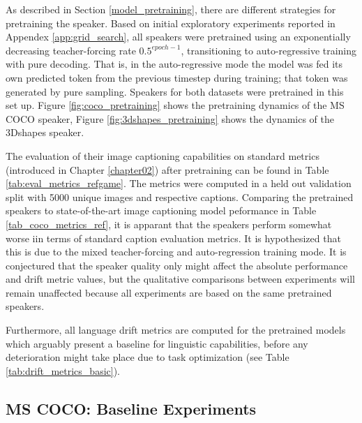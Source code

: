 As described in Section \ref{model_pretraining}, there are different strategies for pretraining the speaker. Based on initial exploratory experiments reported in Appendex \ref{app:grid_search}, all speakers were pretrained using an exponentially decreasing teacher-forcing rate $0.5^{epoch-1}$, transitioning to auto-regressive training with pure decoding. That is, in the auto-regressive mode the model was fed its own predicted token from the previous timestep during training; that token was generated by pure sampling. Speakers for both datasets were pretrained in this set up. Figure \ref{fig:coco_pretraining} shows the pretraining dynamics of the MS COCO speaker, Figure \ref{fig:3dshapes_pretraining} shows the dynamics of the 3Dshapes speaker.

The evaluation of their image captioning capabilities on standard metrics (introduced in Chapter \ref{chapter02}) after pretraining can be found in Table \ref{tab:eval_metrics_refgame}. The metrics were computed in a held out validation split with 5000 unique images and respective captions. Comparing the pretrained speakers to state-of-the-art image captioning model peformance in Table \ref{tab_coco_metrics_ref}, it is apparant that the speakers perform somewhat worse iin terms of standard caption evaluation metrics. It is hypothesized that this is due to the mixed teacher-forcing and auto-regression training mode. It is conjectured that the speaker quality only might affect the absolute performance and drift metric values, but the qualitative comparisons between experiments will remain unaffected because all experiments are based on the same pretrained speakers.

Furthermore, all language drift metrics are computed for the pretrained models which arguably present a baseline for linguistic capabilities, before any deterioration might take place due to task optimization (see Table \ref{tab:drift_metrics_basic}).

\subsection{MS COCO: Baseline Experiments}
\label{expt:coco_baseline}

